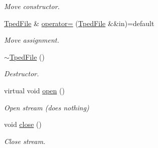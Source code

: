 \begin{DoxyCompactItemize}
\begin{DoxyCompactList}\small\item\em Move constructor. \end{DoxyCompactList}\item 
\mbox{\label{classvarfiles_1_1_tped_file_a3a37fd70881b8c8cf52111ec66a6b43a}} 
\hyperlink{classvarfiles_1_1_tped_file}{Tped\+File} \& \hyperlink{classvarfiles_1_1_tped_file_a3a37fd70881b8c8cf52111ec66a6b43a}{operator=} (\hyperlink{classvarfiles_1_1_tped_file}{Tped\+File} \&\&in)=default
\begin{DoxyCompactList}\small\item\em Move assignment. \end{DoxyCompactList}\item 
\mbox{\label{classvarfiles_1_1_tped_file_aa8ffb24aabf16bdb2b3aeb58aa27572e}} 
\hyperlink{classvarfiles_1_1_tped_file_aa8ffb24aabf16bdb2b3aeb58aa27572e}{$\sim$\+Tped\+File} ()
\begin{DoxyCompactList}\small\item\em Destructor. \end{DoxyCompactList}\item 
\mbox{\label{classvarfiles_1_1_tped_file_abf9a9f82f6d82091c9a56bc9a36a5080}} 
virtual void \hyperlink{classvarfiles_1_1_tped_file_abf9a9f82f6d82091c9a56bc9a36a5080}{open} ()
\begin{DoxyCompactList}\small\item\em Open stream (does nothing) \end{DoxyCompactList}\item 
\mbox{\label{classvarfiles_1_1_tped_file_a3723eb70be770eff95515effb282faad}} 
void \hyperlink{classvarfiles_1_1_tped_file_a3723eb70be770eff95515effb282faad}{close} ()
\begin{DoxyCompactList}\small\item\em Close stream. \end{DoxyCompactList}\end{DoxyCompactItemize}
